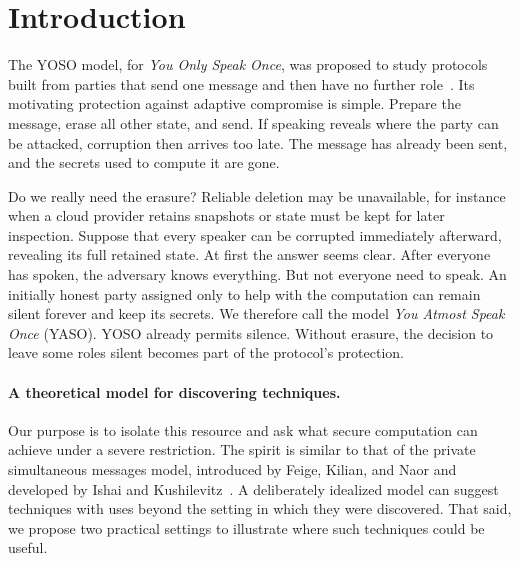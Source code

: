 \section{Introduction}
\label{sec:introduction}

The YOSO model, for \emph{You Only Speak Once}, was proposed to study
protocols built from parties that send one message and then have no
further role~\cite{GentryEtAl2021YOSOFull}.  Its motivating protection
against adaptive compromise is simple.  Prepare the message, erase all
other state, and send.  If speaking reveals where the party can be
attacked, corruption then arrives too late.  The message has already
been sent, and the secrets used to compute it are gone.

Do we really need the erasure?  Reliable deletion may be unavailable,
for instance when a cloud provider retains snapshots or state must be
kept for later inspection.  Suppose that every speaker can be corrupted
immediately afterward, revealing its full retained state.  At first
the answer seems clear.  After everyone has spoken, the adversary knows
everything.  But not everyone need to speak.  An initially honest
party assigned only to help with the computation can remain silent
forever and keep its secrets.
We therefore call the model \emph{You Atmost Speak Once} (YASO).
YOSO already permits silence.  Without erasure, the decision to leave
some roles silent becomes part of the protocol's protection.

\paragraph{A theoretical model for discovering techniques.}
Our purpose is to isolate this resource and ask what secure computation
can achieve under a severe restriction.  The spirit is similar to that
of the private simultaneous messages model, introduced by Feige, Kilian,
and Naor and developed by Ishai and
Kushilevitz~\cite{FeigeKilianNaor1994MinimalModel,IshaiKushilevitz1997PSM}.
A deliberately idealized model can
suggest techniques with uses beyond the setting in which they were
discovered.  That said, we propose two practical settings to illustrate where
such techniques could be useful.

